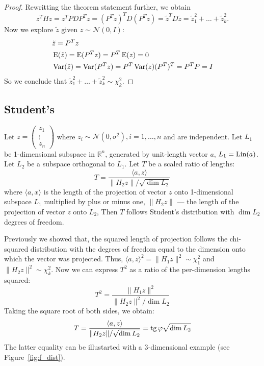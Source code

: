 \begin{proof}
Rewritting the theorem statement further, we obtain
\[
z^T H z = z^T P D P^T z = (P^T z)^T D (P^T z) = \tilde z^T D \tilde z = \tilde z_1^2 + \ldots + \tilde z_k^2.
\]
Now we explore $\tilde z$ given $z \sim \mathcal{N}(0, I)$:
\begin{align*}
&\tilde z = P^T z \\
&\operatorname{E}(\tilde z) = \operatorname{E}(P^T z) = P^T \operatorname{E}(z) = 0 \\
&\operatorname{Var}(\tilde z) = \operatorname{Var}(P^T z) = P^T \operatorname{Var}(z) (P^T)^T = P^T P = I
\end{align*}
So we conclude that $\tilde z_1^2 + \ldots + \tilde z_k^2 \sim \chi^2_k$.

\end{proof}


\subsection{Student's}


\begin{definition}
Let  $z = \begin{pmatrix} z_1 \\ \vdots \\ z_n \end{pmatrix}$
where $z_i \sim \mathcal{N}(0, \sigma^2), i=1, \ldots, n$ and are independent.
Let $L_1$ be 1-dimensional subspace in $\mathbb{R}^{n}$,
generated by unit-length vector $a$, $L_1 = \operatorname{Lin}(a)$.
Let $L_2$ be a subspace orthogonal to $L_1$.
Let $T$ be a scaled ratio of lengths:
\[
T = \frac{\langle a, z \rangle}{\lVert H_2 z \rVert / \sqrt{\dim L_2}}
\]
where $\langle a, x \rangle$ is the length of the projection of vector $z$ onto
1-dimensional subspace $L_1$ multiplied by plus or minus one,
$\lVert H_2 z \rVert$ — the length of the projection of vector $z$ onto $L_2$,
Then $T$ follows Student's distribution with $\dim L_2$ degrees of freedom.
\end{definition}


Previously we showed that, the squared length of projection follows
the chi-squared distribution with the degrees of freedom equal to the dimension
onto which the vector was projected. Thus, $\langle a, z \rangle^2 = \lVert H_1 z \rVert^2 \sim \chi^2_1$
and $\lVert H_2 z \rVert^2 \sim \chi^2_{k}$.
Now we can express $T^2$ as a ratio of the per-dimension lengths squared:
\[
T^2 = \frac{\lVert H_1 z \rVert^2}{\lVert H_2 z \rVert^2 / \dim L_2}
\]
Taking the square root of both sides, we obtain:
\[
T = \frac{\langle a, z \rangle}{\lVert H_2 z \rVert / \sqrt{\dim L_2}} = \operatorname{tg} \varphi \sqrt{\dim L_2}
\]
The latter equality can be illustarted with a $3$-dimensional example (see Figure~\ref{fig:f_dist}).





